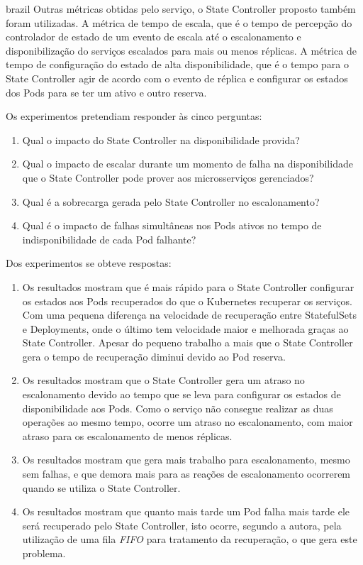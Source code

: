 \begin{otherlanguage*}{brazil}
Outras métricas obtidas pelo serviço, o State Controller proposto também
foram utilizadas. A métrica de tempo de escala, que é o tempo de percepção
do controlador de estado de um evento de escala até o escalonamento e
disponibilização do serviços escalados para mais ou menos réplicas. A métrica
de tempo de configuração do estado de alta disponibilidade, que é o tempo
para o State Controller agir de acordo com o evento de réplica e configurar
os estados dos Pods para se ter um ativo e outro reserva.

Os experimentos pretendiam responder às cinco perguntas:

\begin{enumerate}
    \item Qual o impacto do State Controller na disponibilidade provida?
    \item Qual o impacto de escalar durante um momento de falha na
    disponibilidade que o State Controller pode prover aos microsserviços
    gerenciados?
    \item Qual é a sobrecarga gerada pelo State Controller no escalonamento?
    \item Qual é o impacto de falhas simultâneas nos Pods ativos no tempo de
    indisponibilidade de cada Pod falhante?
\end{enumerate}

Dos experimentos se obteve respostas:

\begin{enumerate}
    \item Os resultados mostram que é mais rápido para o State Controller
    configurar os estados aos Pods recuperados do que o Kubernetes recuperar
    os serviços. Com uma pequena diferença na velocidade de recuperação entre
    StatefulSets e Deployments, onde o último tem velocidade maior e melhorada
    graças ao State Controller. Apesar do pequeno trabalho a mais que o State
    Controller gera o tempo de recuperação diminui devido ao Pod reserva.
    \item Os resultados mostram que o State Controller gera um atraso no
    escalonamento devido ao tempo que se leva para configurar os estados de
    disponibilidade aos Pods. Como o serviço não consegue realizar as duas
    operações ao mesmo tempo, ocorre um atraso no escalonamento, com maior atraso
    para os escalonamento de menos réplicas.
    \item Os resultados mostram que gera mais trabalho para escalonamento, mesmo
    sem falhas, e que demora mais para as reações de escalonamento ocorrerem
    quando se utiliza o State Controller.
    \item Os resultados mostram que quanto mais tarde um Pod falha mais tarde ele
    será recuperado pelo State Controller, isto ocorre, segundo a autora, pela
    utilização de uma fila \textit{FIFO} para tratamento da recuperação, o que
    gera este problema.
\end{enumerate}


\end{otherlanguage*}
